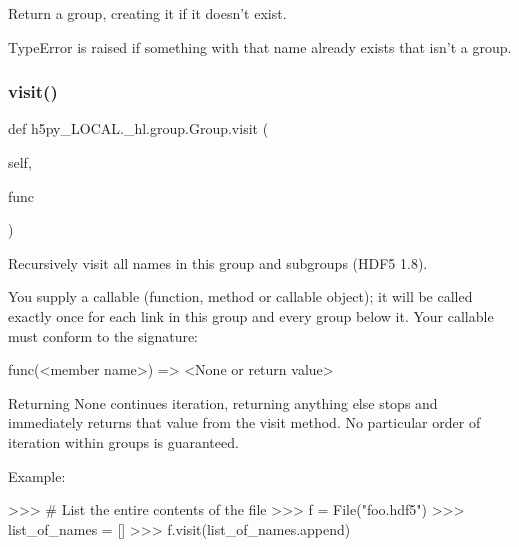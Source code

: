 \begin{DoxyVerb}Return a group, creating it if it doesn't exist.

TypeError is raised if something with that name already exists that
isn't a group.
\end{DoxyVerb}
 \mbox{\label{classh5py__LOCAL_1_1__hl_1_1group_1_1Group_a44fd1b9e065b9c7156bebd875c281f15}} 
\subsubsection{\texorpdfstring{visit()}{visit()}}
{\footnotesize\ttfamily def h5py\+\_\+\+L\+O\+C\+A\+L.\+\_\+hl.\+group.\+Group.\+visit (\begin{DoxyParamCaption}\item[{}]{self,  }\item[{}]{func }\end{DoxyParamCaption})}

\begin{DoxyVerb}Recursively visit all names in this group and subgroups (HDF5 1.8).

You supply a callable (function, method or callable object); it
will be called exactly once for each link in this group and every
group below it. Your callable must conform to the signature:

    func(<member name>) => <None or return value>

Returning None continues iteration, returning anything else stops
and immediately returns that value from the visit method.  No
particular order of iteration within groups is guaranteed.

Example:

>>> # List the entire contents of the file
>>> f = File("foo.hdf5")
>>> list_of_names = []
>>> f.visit(list_of_names.append)
\end{DoxyVerb}
 \mbox{\label{classh5py__LOCAL_1_1__hl_1_1group_1_1Group_a820a244df4042520aecaa0f853cc9d92}} 
